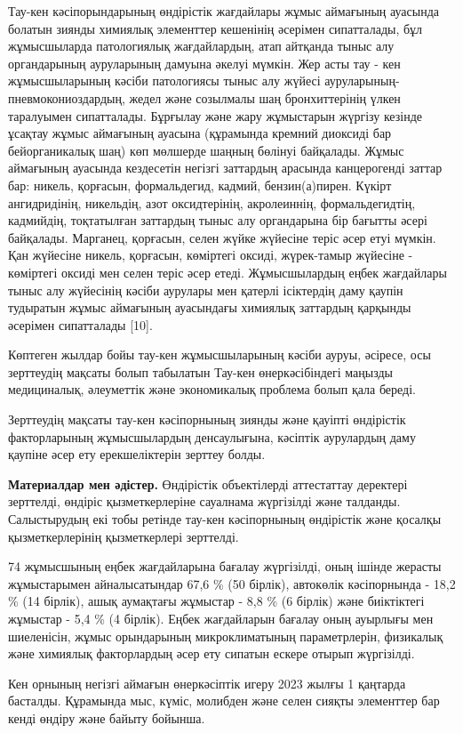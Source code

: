 Тау-кен кәсіпорындарының өндірістік жағдайлары жұмыс аймағының ауасында
болатын зиянды химиялық элементтер кешенінің әсерімен сипатталады, бұл
жұмысшыларда патологиялық жағдайлардың, атап айтқанда тыныс алу
органдарының ауруларының дамуына әкелуі мүмкін. Жер асты тау - кен
жұмысшыларының кәсіби патологиясы тыныс алу жүйесі
ауруларының-пневмокониоздардың, жедел және созылмалы шаң бронхиттерінің
үлкен таралуымен сипатталады. Бұрғылау және жару жұмыстарын жүргізу
кезінде ұсақтау жұмыс аймағының ауасына (құрамында кремний диоксиді бар
бейорганикалық шаң) көп мөлшерде шаңның бөлінуі байқалады. Жұмыс
аймағының ауасында кездесетін негізгі заттардың арасында канцерогенді
заттар бар: никель, қорғасын, формальдегид, кадмий, бензин(а)пирен.
Күкірт ангидридінің, никельдің, азот оксидтерінің, акролеиннің,
формальдегидтің, кадмийдің, тоқтатылған заттардың тыныс алу органдарына
бір бағытты әсері байқалады. Марганец, қорғасын, селен жүйке жүйесіне
теріс әсер етуі мүмкін. Қан жүйесіне никель, қорғасын, көміртегі оксиді,
жүрек-тамыр жүйесіне - көміртегі оксиді мен селен теріс әсер етеді.
Жұмысшылардың еңбек жағдайлары тыныс алу жүйесінің кәсіби аурулары мен
қатерлі ісіктердің даму қаупін тудыратын жұмыс аймағының ауасындағы
химиялық заттардың қарқынды әсерімен сипатталады {[}10{]}.

Көптеген жылдар бойы тау-кен жұмысшыларының кәсіби ауруы, әсіресе, осы
зерттеудің мақсаты болып табылатын Тау-кен өнеркәсібіндегі маңызды
медициналық, әлеуметтік және экономикалық проблема болып қала береді.

Зерттеудің мақсаты тау-кен кәсіпорнының зиянды және қауіпті өндірістік
факторларының жұмысшылардың денсаулығына, кәсіптік аурулардың даму
қаупіне әсер ету ерекшеліктерін зерттеу болды.

{\bfseries Материалдар мен әдістер.} Өндірістік объектілерді аттестаттау
деректері зерттелді, өндіріс қызметкерлеріне сауалнама жүргізілді және
талданды. Салыстырудың екі тобы ретінде тау-кен кәсіпорнының өндірістік
және қосалқы қызметкерлерінің қызметкерлері зерттелді.

74 жұмысшының еңбек жағдайларына бағалау жүргізілді, оның ішінде жерасты
жұмыстарымен айналысатындар 67,6 \% (50 бірлік), автокөлік кәсіпорнында
- 18,2 \% (14 бірлік), ашық аумақтағы жұмыстар - 8,8 \% (6 бірлік) және
биіктіктегі жұмыстар - 5,4 \% (4 бірлік). Еңбек жағдайларын бағалау оның
ауырлығы мен шиеленісін, жұмыс орындарының микроклиматының
параметрлерін, физикалық және химиялық факторлардың әсер ету сипатын
ескере отырып жүргізілді.

Кен орнының негізгі аймағын өнеркәсіптік игеру 2023 жылғы 1 қаңтарда
басталды. Құрамында мыс, күміс, молибден және селен сияқты элементтер
бар кенді өндіру және байыту бойынша.

